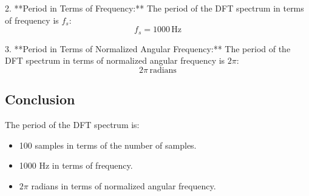 2. **Period in Terms of Frequency:**
   The period of the DFT spectrum in terms of frequency is \( f_s \):
   \[
   f_s = 1000 \, \text{Hz}
   \]

3. **Period in Terms of Normalized Angular Frequency:**
   The period of the DFT spectrum in terms of normalized angular frequency is \( 2\pi \):
   \[
   2\pi \, \text{radians}
   \]

\subsection*{Conclusion}
The period of the DFT spectrum is:
\begin{itemize}
    \item 100 samples in terms of the number of samples.
    \item 1000 Hz in terms of frequency.
    \item \( 2\pi \) radians in terms of normalized angular frequency.
\end{itemize}
